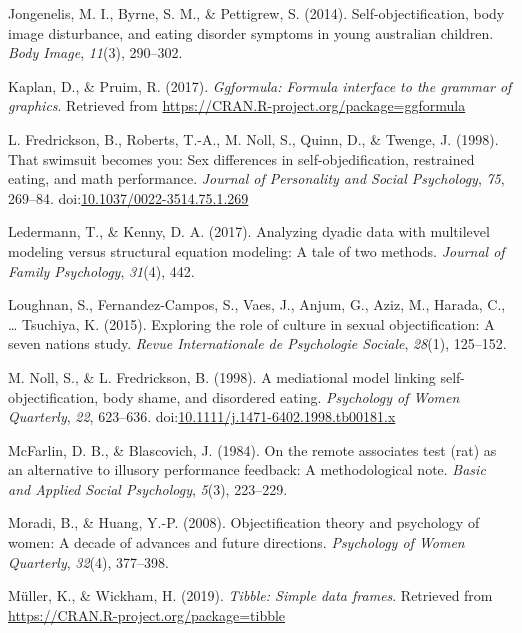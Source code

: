 \documentclass[man]{apa6}
\begin{document}
\hypertarget{ref-jongenelis2014}{}
Jongenelis, M. I., Byrne, S. M., \& Pettigrew, S. (2014).
Self-objectification, body image disturbance, and eating disorder
symptoms in young australian children. \emph{Body Image}, \emph{11}(3),
290--302.

\hypertarget{ref-R-ggformula}{}
Kaplan, D., \& Pruim, R. (2017). \emph{Ggformula: Formula interface to
the grammar of graphics}. Retrieved from
\url{https://CRAN.R-project.org/package=ggformula}

\hypertarget{ref-fredricksonetal1998}{}
L. Fredrickson, B., Roberts, T.-A., M. Noll, S., Quinn, D., \& Twenge,
J. (1998). That swimsuit becomes you: Sex differences in
self-objedification, restrained eating, and math performance.
\emph{Journal of Personality and Social Psychology}, \emph{75}, 269--84.
doi:\href{https://doi.org/10.1037/0022-3514.75.1.269}{10.1037/0022-3514.75.1.269}

\hypertarget{ref-ledermann2017analyzing}{}
Ledermann, T., \& Kenny, D. A. (2017). Analyzing dyadic data with
multilevel modeling versus structural equation modeling: A tale of two
methods. \emph{Journal of Family Psychology}, \emph{31}(4), 442.

\hypertarget{ref-loughnan2015}{}
Loughnan, S., Fernandez-Campos, S., Vaes, J., Anjum, G., Aziz, M.,
Harada, C., \ldots{} Tsuchiya, K. (2015). Exploring the role of culture
in sexual objectification: A seven nations study. \emph{Revue
Internationale de Psychologie Sociale}, \emph{28}(1), 125--152.

\hypertarget{ref-nollfredrickson1998}{}
M. Noll, S., \& L. Fredrickson, B. (1998). A mediational model linking
self-objectification, body shame, and disordered eating.
\emph{Psychology of Women Quarterly}, \emph{22}, 623--636.
doi:\href{https://doi.org/10.1111/j.1471-6402.1998.tb00181.x}{10.1111/j.1471-6402.1998.tb00181.x}

\hypertarget{ref-mcfarlin1984remote}{}
McFarlin, D. B., \& Blascovich, J. (1984). On the remote associates test
(rat) as an alternative to illusory performance feedback: A
methodological note. \emph{Basic and Applied Social Psychology},
\emph{5}(3), 223--229.

\hypertarget{ref-moradi2008}{}
Moradi, B., \& Huang, Y.-P. (2008). Objectification theory and
psychology of women: A decade of advances and future directions.
\emph{Psychology of Women Quarterly}, \emph{32}(4), 377--398.

\hypertarget{ref-R-tibble}{}
Müller, K., \& Wickham, H. (2019). \emph{Tibble: Simple data frames}.
Retrieved from \url{https://CRAN.R-project.org/package=tibble}
\end{document}
